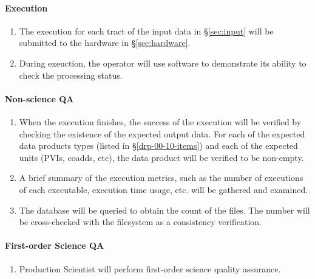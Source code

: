 \paragraph{Execution}
\begin{enumerate}
  \item{The execution for each tract of the input data in \S\ref{sec:input} will be submitted to the hardware in \S\ref{sec:hardware}.}
  \item{During exeuction, the operator will use software to demonstrate its ability to check the processing status.}
\end{enumerate}

\paragraph{Non-science QA}
\begin{enumerate}
  \item{When the execution finishes, the success of the execution will be verified by checking the existence of the expected output data.
  For each of the expected data products types (listed in \S\ref{drp-00-10-items})
  and each of the expected units (PVIs, coadds, etc), the data product will be
  verified to be non-empty.}
  \item{A brief summary of the execution metrics, such as the number of executions of each executable, execution time usage, etc. will be gathered and examined.}
  \item{The database will be queried to obtain the count of the files. The number will be cross-checked with the filesystem as a consistency verification.}
\end{enumerate}
\paragraph{First-order Science QA}
\begin{enumerate}
  \item{Production Scientist will perform first-order science quality assurance.}
\end{enumerate}
